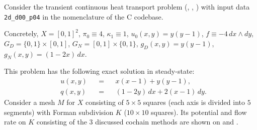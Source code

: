 \begin{example}
  \label{idec/diffusion/continuous/transient/examples/2d_d00_p04-example}
  Consider the transient continuous heat transport problem
  (,
   ,
   )
  with input data \verb|2d_d00_p04| in the nomenclature of the C codebase.

  Concretely,
    $X = [0, 1]^2$,
    $\pi_0 \equiv 4$,
    $\kappa_1 \equiv 1$,
    $u_0(x, y) = y (y - 1)$,
    $f \equiv -4\, d x \wedge d y$,
    $G_D = \{0, 1\} \times [0, 1]$,
    $G_N = [0, 1] \times \{0, 1\}$,
    $g_D(x, y) = y (y - 1)$,
    $g_N(x, y) = (1 - 2 x)\, d x$.

  This problem has the following exact solution in steady-state:
  \begin{subequations}
    \begin{alignat}{3}
      & u(x, y) && = && x (x - 1) + y ( y - 1), \\
      & q(x, y) && = && (1 - 2 y)\, d x + 2 (x - 1)\, d y.
    \end{alignat}
  \end{subequations}
  Consider a mesh $M$ for $X$ consisting of $5 \times 5$ squares (each axis is
  divided into $5$ segments) with Forman subdivision $K$
  ($10 \times 10$ squares).
  Its potential and flow rate on $K$ consisting of the $3$ discussed cochain
  methods are shown on
  and
  .
\end{example}
